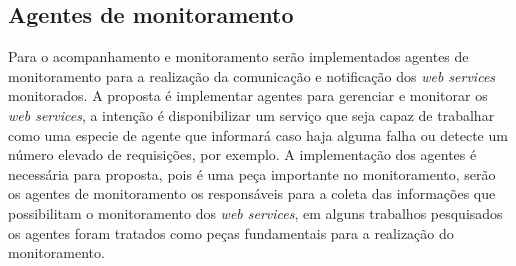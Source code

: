\subsection{Agentes de monitoramento}

Para o acompanhamento e monitoramento serão implementados agentes de monitoramento para a realização da comunicação e notificação dos \textit{web services} monitorados. A proposta é implementar agentes para gerenciar e monitorar os \textit{web services}, a intenção é disponibilizar um serviço que seja capaz de trabalhar como uma especie de agente que informará caso haja alguma falha ou detecte um número elevado de requisições, por exemplo. A implementação dos agentes é necessária para proposta, pois é uma peça importante no monitoramento, serão os agentes de monitoramento os responsáveis para a coleta das informações que possibilitam o monitoramento dos \textit{web services}, em alguns trabalhos pesquisados os agentes foram tratados como peças fundamentais para a realização do monitoramento.       


